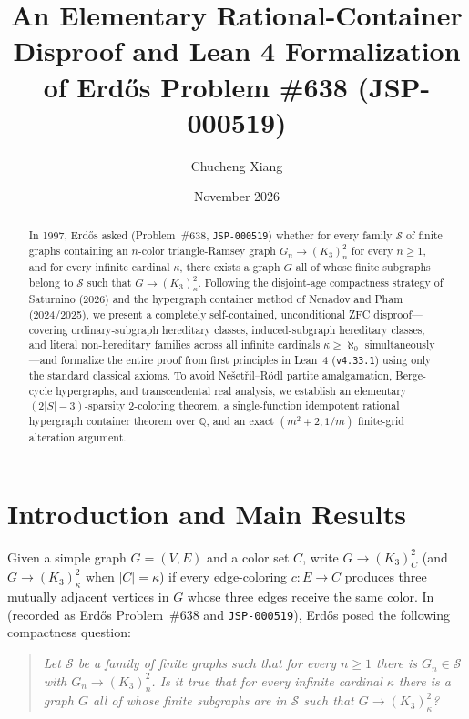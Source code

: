 \documentclass[11pt]{amsart}
\title[Formalization of Erd\H{o}s Problem \#638 (JSP-000519)]{An Elementary Rational-Container Disproof and Lean 4 Formalization of Erd\H{o}s Problem \#638 (JSP-000519)}
\author{Chucheng Xiang}
\date{November 2026}
\theoremstyle{definition}
\theoremstyle{remark}
\begin{document}
\begin{abstract}
In 1997, Erd\H{o}s asked (Problem~\#638, \texttt{JSP-000519}) whether for every family $\mathcal{S}$ of finite graphs containing an $n$-color triangle-Ramsey graph $G_n \to (K_3)^2_n$ for every $n \ge 1$, and for every infinite cardinal $\kappa$, there exists a graph $G$ all of whose finite subgraphs belong to $\mathcal{S}$ such that $G \to (K_3)^2_\kappa$. Following the disjoint-age compactness strategy of Saturnino (2026) and the hypergraph container method of Nenadov and Pham (2024/2025), we present a completely self-contained, unconditional ZFC disproof---covering ordinary-subgraph hereditary classes, induced-subgraph hereditary classes, and literal non-hereditary families across all infinite cardinals $\kappa \ge \aleph_0$ simultaneously---and formalize the entire proof from first principles in Lean~4 (\texttt{v4.33.1}) using only the standard classical axioms. To avoid Ne\v{s}et\v{r}il--R\"odl partite amalgamation, Berge-cycle hypergraphs, and transcendental real analysis, we establish an elementary $(2|S|-3)$-sparsity $2$-coloring theorem, a single-function idempotent rational hypergraph container theorem over $\mathbb{Q}$, and an exact $(m^2+2, 1/m)$ finite-grid alteration argument.
\end{abstract}

\maketitle

\section{Introduction and Main Results}

Given a simple graph $G = (V, E)$ and a color set $C$, write $G \to (K_3)^2_C$ (and $G \to (K_3)^2_\kappa$ when $|C| = \kappa$) if every edge-coloring $c : E \to C$ produces three mutually adjacent vertices in $G$ whose three edges receive the same color. In \cite[Item~9, pp.~83--84]{Er97d} (recorded as Erd\H{o}s Problem~\#638 and \texttt{JSP-000519}), Erd\H{o}s posed the following compactness question:

\begin{quote}
\emph{Let $\mathcal{S}$ be a family of finite graphs such that for every $n \ge 1$ there is $G_n \in \mathcal{S}$ with $G_n \to (K_3)^2_n$. Is it true that for every infinite cardinal $\kappa$ there is a graph $G$ all of whose finite subgraphs are in $\mathcal{S}$ such that $G \to (K_3)^2_\kappa$?}
\end{quote}
\end{document}
